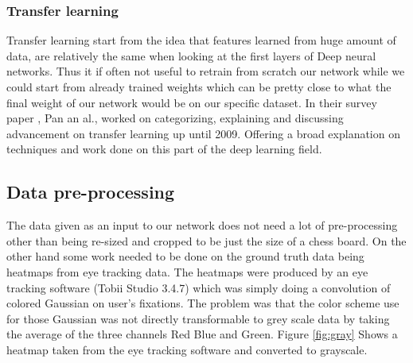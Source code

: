 \subsubsection{Transfer learning}\label{section:transfl}

Transfer learning start from the idea that features learned from huge amount of data, are relatively the same when looking at the first layers of Deep neural networks. Thus it if often not useful to retrain from scratch our network while we could start from already trained weights which can be pretty close to what the final weight of our network would be on our specific dataset. 
In their survey paper \cite{Pan:2010:STL:1850483.1850545}, Pan an al., worked on categorizing, explaining and discussing advancement on transfer learning up until 2009. Offering a broad explanation on techniques and work done on this part of the deep learning field.


\subsection{Data pre-processing}
The data given as an input to our network does not need a lot of pre-processing other than being re-sized and cropped to be just the size of a chess board. On the other hand some work needed to be done on the ground truth data being heatmaps from eye tracking data. The heatmaps were produced by an eye tracking software (Tobii Studio 3.4.7) which was simply doing a convolution of colored Gaussian on user's fixations. The problem was that the color scheme use for those Gaussian was not directly transformable to grey scale data by taking the average of the three channels Red Blue and Green. Figure \ref{fig:gray} Shows a heatmap taken from the eye tracking software and converted to grayscale.\\


